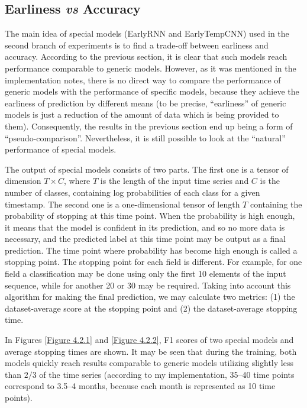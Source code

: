 \documentclass{article}
\begin{document}
\subsection{Earliness \textit{vs} Accuracy}

The main idea of special models (EarlyRNN and EarlyTempCNN) used in the second branch of experiments is to find a trade-off between earliness and accuracy. According to the previous section, it is clear that such models reach performance comparable to generic models. However, as it was mentioned in the implementation notes, there is no direct way to compare the performance of generic models with the performance of specific models, because they achieve the earliness of prediction by different means (to be precise, “earliness” of generic models is just a reduction of the amount of data which is being provided to them). Consequently, the results in the previous section end up being a form of “pseudo-comparison”. Nevertheless, it is still possible to look at the “natural” performance of special models.

The output of special models consists of two parts. The first one is a tensor of dimension $T \times C$, where $T$ is the length of the input time series and $C$ is the number of classes, containing log probabilities of each class for a given timestamp. The second one is a one-dimensional tensor of length $T$ containing the probability of stopping at this time point. When the probability is high enough, it means that the model is confident in its prediction, and so no more data is necessary, and the predicted label at this time point may be output as a final prediction. The time point where probability has become high enough is called a stopping point. The stopping point for each field is different. For example, for one field a classification may be done using only the first 10 elements of the input sequence, while for another 20 or 30 may be required. Taking into account this algorithm for making the final prediction, we may calculate two metrics: (1) the dataset-average score at the stopping point and (2) the dataset-average stopping time.

In Figures \ref{Figure 4.2.1} and \ref{Figure 4.2.2}, F1 scores of two special models and average stopping times are shown. It may be seen that during the training, both models quickly reach results comparable to generic models utilizing slightly less than $2/3$ of the time series (according to my implementation, 35–40 time points correspond to 3.5–4 months, because each month is represented as 10 time points).
\end{document}
